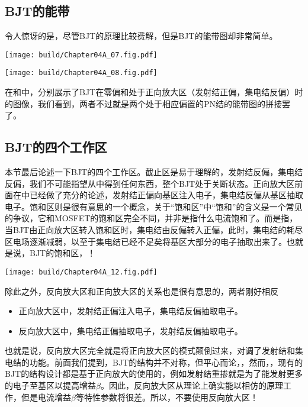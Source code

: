 \subsection{BJT的能带}
令人惊讶的是，尽管BJT的原理比较费解，但是BJT的能带图却非常简单。

\begin{Figure}[BJT的能带]
    \begin{FigureSub}[截止区]
        \texttt{[image: build/Chapter04A\_07.fig.pdf]}
    \end{FigureSub}
    \begin{FigureSub}[放大区]
        \texttt{[image: build/Chapter04A\_08.fig.pdf]}
    \end{FigureSub}
\end{Figure}

在和中，分别展示了BJT在零偏和处于正向放大区（发射结正偏，集电结反偏）时的图像，我们看到，两者不过就是两个处于相应偏置的PN结的能带图的拼接罢了。

\subsection{BJT的四个工作区}
本节最后论述一下BJT的四个工作区。截止区是易于理解的，发射结反偏，集电结反偏，我们不可能指望从中得到任何东西，整个BJT处于关断状态。正向放大区前面在中已经做了充分的论述，发射结正偏向基区注入电子，集电结反偏从基区抽取电子。饱和区则是很有意思的一个概念，关于“饱和区”中“饱和”的含义是一个常见的争议，它和MOSFET的饱和区完全不同，并非是指什么电流饱和了。而是指\cite{se:BJT饱和}，当BJT由正向放大区转入饱和区时，集电结由反偏转入正偏，此时，集电结的耗尽区电场逐渐减弱，以至于集电结已经不足矣将基区大部分的电子抽取出来了。也就是说，BJT的饱和区，！
\begin{Figure}[BJT的四个工作区]
    \texttt{[image: build/Chapter04A\_12.fig.pdf]}
\end{Figure}

除此之外，反向放大区和正向放大区的关系也是很有意思的，两者刚好相反
\begin{itemize}
    \item 正向放大区中，发射结正偏注入电子，集电结反偏抽取电子。
    \item 反向放大区中，集电结正偏抽取电子，发射结反偏抽取电子。
\end{itemize}
也就是说，反向放大区完全就是将正向放大区的模式颠倒过来，对调了发射结和集电结的功能。前面我们提到，BJT的结构并不对称，但平心而论，，然而，，现有的BJT的结构设计都是基于正向放大的使用的，例如发射结重掺就是为了能发射更多的电子至基区以提高增益$\beta$。因此，反向放大区从理论上确实能以相仿的原理工作，但是电流增益$\beta$等特性参数将很差。所以，不要使用反向放大区！

